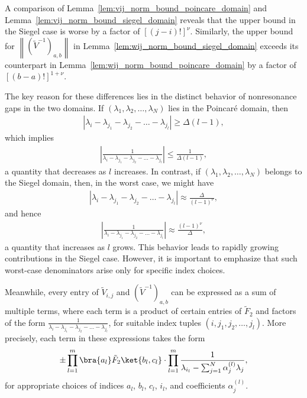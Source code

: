 \documentclass[superscriptaddress,onecolumn,nofootinbib,longbibliography,a4paper,accepted=2026-09-29]{quantumarticle}
\theoremstyle{plain}
\theoremstyle{definition}
\numberwithin{thm}{section}
\numberwithin{assumption}{section}
\numberwithin{lemma}{section}
\numberwithin{prop}{section}
\numberwithin{cor}{section}
\numberwithin{definition}{section}
\numberwithin{rmk}{section}
\numberwithin{equation}{section}
\newcommand{\norm}[1]     {\left\| #1 \right\|}
\begin{document}
A comparison of Lemma~\ref{lem:vij_norm_bound_poincare_domain} and Lemma~\ref{lem:vij_norm_bound_siegel_domain} reveals that the upper bound in the Siegel case is worse by a factor of $[(j - i)!]^{\nu}$. Similarly, the upper bound for $\norm{(\tilde{V}^{-1})_{a,b}}$ in Lemma~\ref{lem:wij_norm_bound_siegel_domain} exceeds its counterpart in Lemma~\ref{lem:wij_norm_bound_poincare_domain} by a factor of $[(b - a)!]^{1 + \nu}$.

The key reason for these differences lies in the distinct behavior of nonresonance gaps in the two domains. If $(\lambda_1, \lambda_2, \dots, \lambda_N)$ lies in the Poincar\'{e} domain, then
\begin{align}
\left| \lambda_i - \lambda_{j_1} - \lambda_{j_2} - \dots - \lambda_{j_l} \right| \ge \Delta(l - 1),
\end{align}
which implies
\begin{align}
\left| \frac{1}{\lambda_i - \lambda_{j_1} - \lambda_{j_2} - \dots - \lambda_{j_l}} \right| \le \frac{1}{\Delta(l - 1)},
\end{align}
a quantity that decreases as $l$ increases. In contrast, if $(\lambda_1, \lambda_2, \dots, \lambda_N)$ belongs to the Siegel domain, then, in the worst case, we might have
\begin{align}
\left| \lambda_i - \lambda_{j_1} - \lambda_{j_2} - \dots - \lambda_{j_l} \right| \approx \frac{\Delta}{(l - 1)^{\nu}},
\end{align}
and hence
\begin{align}
\left| \frac{1}{\lambda_i - \lambda_{j_1} - \lambda_{j_2} - \dots - \lambda_{j_l}} \right| \approx \frac{(l - 1)^{\nu}}{\Delta},
\label{eq:worst_scenario_nonresonance_gap}
\end{align}
a quantity that increases as $l$ grows. This behavior leads to rapidly growing contributions in the Siegel case. However, it is important to emphasize that such worst-case denominators arise only for specific index choices.

Meanwhile, every entry of $\tilde{V}_{i,j}$ and $(\tilde{V}^{-1})_{a,b}$ can be expressed as a sum of multiple terms, where each term is a product of certain entries of $\tilde{F}_2$ and factors of the form $\frac{1}{\lambda_i - \lambda_{j_1} - \lambda_{j_2} - \dots - \lambda_{j_l}}$, for suitable index tuples $(i, j_1, j_2, \dots, j_l)$. More precisely, each term in these expressions takes the form
\[
\pm \prod_{l=1}^m \bra{a_l}\tilde{F}_2\ket{b_l, c_l} \cdot 
\prod_{l=1}^m \frac{1}{\lambda_{i_l} - \sum_{j=1}^N \alpha_j^{(l)} \lambda_j},
\]
for appropriate choices of indices $a_l$, $b_l$, $c_l$, $i_l$, and coefficients $\alpha_j^{(l)}$.
\end{document}
